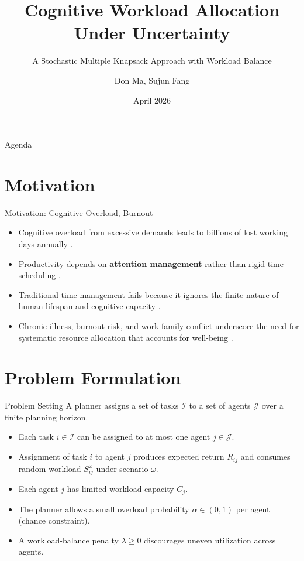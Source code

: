 \documentclass[aspectratio=169,11pt]{beamer}
\title{Cognitive Workload Allocation Under Uncertainty}
\subtitle{A Stochastic Multiple Knapsack Approach with Workload Balance}
\author{Don Ma, Sujun Fang}
\date{April 2026}
\begin{document}
\begin{frame}[plain]
	\titlepage
\end{frame}

\begin{frame}{Agenda}
	\tableofcontents
\end{frame}

\section{Motivation}

\begin{frame}{Motivation: Cognitive Overload, Burnout}
	\begin{itemize}
		\item Cognitive overload from excessive demands leads to billions of lost working
			days annually \citep{Robinson2024}.
		\item Productivity depends on \textbf{attention management} rather than rigid time
			scheduling \citep{Grant2019}.
		\item Traditional time management fails because it ignores the finite nature
			of human lifespan and cognitive capacity \citep{Hart2024}.
		\item Chronic illness, burnout risk, and work-family conflict underscore the
			need for systematic resource allocation that accounts for well-being
			\citep{cook_individual_2024, yoo_critical_2022}.
	\end{itemize}
\end{frame}

\section{Problem Formulation}

\begin{frame}{Problem Setting}
	A planner assigns a set of tasks $\mathcal{I}$ to a set of agents $\mathcal{J}$
	over a finite planning horizon.
	\begin{itemize}
		\item<2-> Each task $i \in \mathcal{I}$ can be assigned to at most one agent $j \in \mathcal{J}$.
		\item<3-> Assignment of task $i$ to agent $j$ produces expected return $R_{ij}$
			and consumes random workload $S_{ij}^\omega$ under scenario $\omega$.
		\item<4-> Each agent $j$ has limited workload capacity $C_j$.
		\item<5-> The planner allows a small overload probability $\alpha \in (0,1)$
			per agent (chance constraint).
		\item<6-> A workload-balance penalty $\lambda \geq 0$ discourages
			uneven utilization across agents.
	\end{itemize}
\end{frame}
\end{document}
